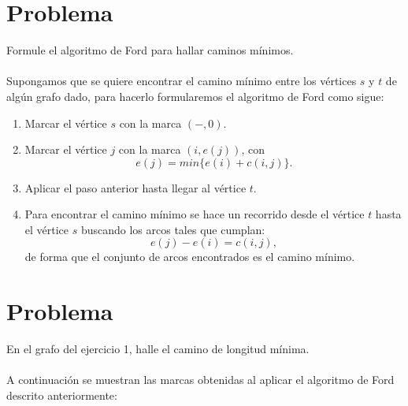 \documentclass[autocontact]{gaceta}
\begin{document}
\section{Problema}
    Formule el algoritmo de Ford para hallar caminos mínimos.\\
    \\Supongamos que se quiere encontrar el camino mínimo entre los vértices $s$ y $t$ de algún grafo dado,
        para hacerlo formularemos el algoritmo de Ford como sigue:
        \begin{center}
            \begin{enumerate}
                \item Marcar el vértice $s$ con la marca $(-, 0)$.
                \item Marcar el vértice $j$ con la marca $(i, e(j))$, con 
                    \begin{equation}\label{eq:p2-1}
                        e(j) = min \{e(i) + c(i,j)\}. 
                    \end{equation}
                \item Aplicar el paso anterior hasta llegar al vértice $t$.
                \item Para encontrar el camino mínimo se hace un recorrido desde el vértice $t$ hasta el 
                        vértice $s$ buscando los arcos tales que cumplan: 
                        \begin{equation}\label{eq:p2-2}
                            e(j) - e(i) = c(i,j),
                        \end{equation}
                        de forma que el conjunto de arcos encontrados es el camino mínimo.
            \end{enumerate}
        \end{center}





\section{Problema}
    En el grafo del ejercicio 1, halle el camino de longitud mínima.\\
    \\A continuación se muestran las marcas obtenidas al aplicar el algoritmo de Ford 
    descrito anteriormente:
    
\end{document}
